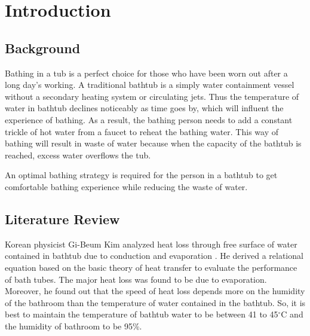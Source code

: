 \documentclass{mcmthesis}
\renewcommand{\contentsname}{\hspace*{\fill}\Large\bfseries Contents \hspace*{\fill}}
\begin{document}
\maketitle

\tableofcontents   %
\thispagestyle{empty}

\newpage


\section{Introduction}

\subsection{Background}

Bathing in a tub is a perfect choice for those who have been worn out after a long day's working. A traditional bathtub is a simply water containment vessel without a secondary heating system or circulating jets. Thus the temperature of water in bathtub declines noticeably as time goes by, which will influent the experience of bathing. As a result, the bathing person needs to add a constant trickle of hot water from a faucet to reheat the bathing water. This way of bathing will result in waste of water because when the capacity of the bathtub is reached, excess water overflows the tub.

An optimal bathing strategy is required for the person in a bathtub to get comfortable bathing experience while reducing the waste of water.

\subsection{Literature Review}

Korean physicist Gi-Beum Kim analyzed heat loss through free surface of water contained in bathtub due to conduction and evaporation \cite{1}. He derived a relational equation based on the basic theory of heat transfer to evaluate the performance of bath tubes. The major heat loss was found to be due to evaporation. Moreover, he found out that the speed of heat loss depends more on the humidity of the bathroom than the temperature of water contained in the bathtub. So, it is best to maintain the temperature of bathtub water to be between 41 to 45$^{\circ}$C and the humidity of bathroom to be 95\%.
\end{document}
